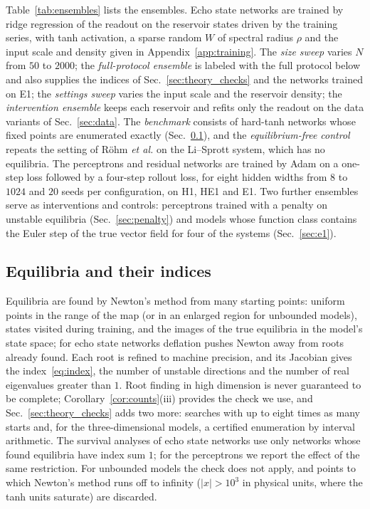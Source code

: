 \documentclass[aip,cha,reprint,amsmath,amssymb,longbibliography]{revtex4-2}
\theoremstyle{definition}
\begin{document}
Table~\ref{tab:ensembles} lists the ensembles. Echo state networks are trained by ridge regression of the readout on the
reservoir states driven by the training series,\cite{LukoseviciusJaeger2009Reservoir} with tanh activation, a sparse random
$W$ of spectral radius $\rho$ and the input scale and density given in Appendix~\ref{app:training}. The \emph{size sweep}
varies $N$ from $50$ to $2000$; the \emph{full-protocol ensemble} is labeled with the full protocol below and also supplies
the indices of Sec.~\ref{sec:theory_checks} and the networks trained on E1; the \emph{settings sweep} varies the input scale
and the reservoir density; the \emph{intervention ensemble} keeps each reservoir and refits only the readout on the data
variants of Sec.~\ref{sec:data}. The \emph{benchmark} consists of hard-tanh networks whose fixed points are enumerated
exactly (Sec.~\ref{sec:equilibria}), and the \emph{equilibrium-free control} repeats the setting of R\"ohm
\textit{et al.}\cite{Rohm2021} on the Li--Sprott system, which has no equilibria. The perceptrons and residual networks
are trained by Adam on a one-step loss followed by a four-step rollout loss, for eight hidden widths from $8$ to $1024$ and
$20$ seeds per configuration, on H1, HE1 and E1. Two further ensembles serve as interventions and controls: perceptrons
trained with a penalty on unstable equilibria (Sec.~\ref{sec:penalty}) and models whose function class contains the Euler
step of the true vector field for four of the systems (Sec.~\ref{sec:e1}).

\subsection{Equilibria and their indices}
\label{sec:equilibria}

Equilibria are found by Newton's method from many starting points: uniform points in the range of the map (or in an
enlarged region for unbounded models), states visited during training, and the images of the true equilibria in the
model's state space; for echo state networks deflation\cite{Farrell2015Deflation} pushes Newton away from roots already found.
Each root is refined to machine precision, and its Jacobian gives the index~\eqref{eq:index}, the number of unstable
directions and the number of real eigenvalues greater than $1$. Root finding in high dimension is never guaranteed to be
complete;\cite{SussilloBarak2013,AllgowerGeorg2003Continuation} Corollary~\ref{cor:counts}(iii) provides the check we use,
and Sec.~\ref{sec:theory_checks} adds two more: searches with up to eight times as many starts and, for the
three-dimensional models, a certified enumeration by interval arithmetic.
The survival analyses of echo state networks use only networks whose found equilibria have index sum $1$; for the
perceptrons we report the effect of the same restriction. For unbounded models the
check does not apply, and points to which Newton's method runs off to infinity ($|x|>10^3$ in physical units, where the tanh
units saturate) are discarded.
\end{document}
